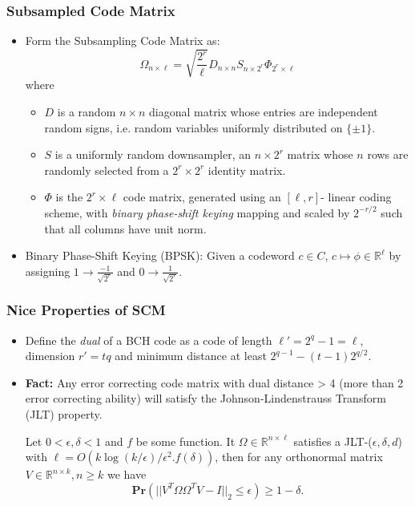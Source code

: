 \documentclass[9pt]{beamer}
\newcommand{\mB}{\mathbb}
\begin{document}
\begin{frame}
\frametitle{Subsampled Code Matrix} 
\begin{itemize} 
\item Form the Subsampling Code Matrix as:
\[ \Omega_{n \times \ell} = \sqrt{ \frac{2^r}{\ell}} D_{n \times n} S_{n \times 2^r} \Phi_{2^r \times \ell} \]
where

\begin{itemize}
\item $D$ is a random $n \times n$ diagonal matrix whose entries are independent random signs, i.e. random variables uniformly distributed on $\{ \pm 1 \}$.
\vspace{3mm}

\item $S$ is a uniformly random downsampler, an $n \times 2^r$ matrix whose $n$ rows are randomly selected from a $2^r \times 2^r$ identity matrix.
\vspace{3mm}

\item $\Phi$ is the $2^r \times \ell$ code matrix, generated using an $[ \ell, r ]$- linear coding scheme, with \textit{binary phase-shift keying} mapping and scaled by $2^{-r/2}$ such that all columns have unit norm.
\vspace{3mm}

\end{itemize}

\item Binary Phase-Shift Keying (BPSK): Given a codeword $c \in C$, $c \mapsto \phi \in \mB{R}^{\ell}$ by assigning $1 \to \frac{-1}{\sqrt{2^r}}$ and $0 \to \frac{1}{\sqrt{2^r}}$.
\end{itemize}

\end{frame}

\begin{frame}
\frametitle{Nice Properties of SCM} 
\begin{itemize} 
\item Define the \textit{dual} of a BCH code as a code of length $\ell' = 2^q - 1 = \ell$, dimension $r' = tq$ and minimum distance at least $2^{q-1} - (t - 1)2^{q/2}$.
\vspace{3mm}

\item \textbf{Fact:} Any error correcting code matrix with dual distance > 4 (more than 2 error correcting ability) will satisfy the Johnson-Lindenstrauss Transform (JLT) property.
\vspace{3mm}

\begin{lemma}
Let $0< \epsilon, \delta < 1$ and $f$ be some function. It $\Omega \in \mB{R}^{n \times \ell}$ satisfies a JLT-($\epsilon, \delta, d$) with $\ell = O(k \log(k /\epsilon)/\epsilon^2. f(\delta))$, then for any orthonormal matrix $V \in \mB{R}^{n \times k}, n \ge k$ we have 
\[ \textbf{Pr}(|| V^T \Omega \Omega^TV - I||_2 \le \epsilon) \ge 1 - \delta. \]
\end{lemma}
\end{itemize}
\end{frame}
\end{document}

